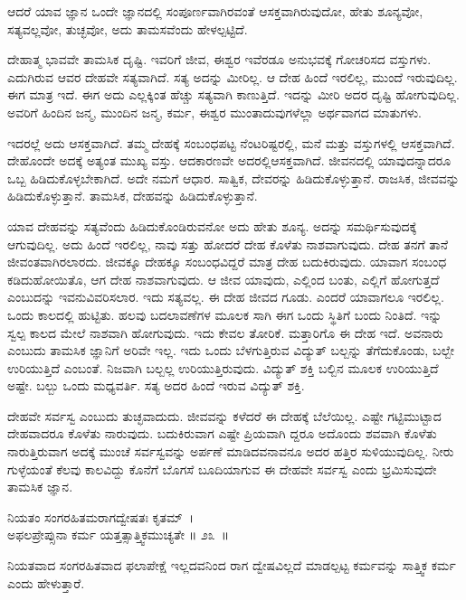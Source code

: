 \begin{artha}
ಆದರೆ ಯಾವ ಜ್ಞಾನ ಒಂದೇ ಜ್ಞಾನದಲ್ಲಿ ಸಂಪೂರ್ಣವಾಗಿರವಂತೆ ಆಸಕ್ತವಾಗಿರುವುದೋ, ಹೇತು ಶೂನ್ಯವೋ, ಸತ್ಯವಲ್ಲವೋ, ತುಚ್ಛವೋ, ಅದು ತಾಮಸವೆಂದು ಹೇಳಲ್ಪಟ್ಟಿದೆ.
\end{artha}

ದೇಹಾತ್ಮ ಭಾವವೇ ತಾಮಸಿಕ ದೃಷ್ಟಿ. ಇವರಿಗೆ ಜೀವ, ಈಶ್ವರ ಇವೆರಡೂ ಅನುಭವಕ್ಕೆ ಗೋಚರಿಸದ ವಸ್ತುಗಳು. ಎದುಗಿರುವ ಆವರ ದೇಹವೇ ಸತ್ಯವಾಗಿದೆ. ಸತ್ಯ ಅದನ್ನು ಮೀರಿಲ್ಲ. ಆ ದೇಹ ಹಿಂದೆ ಇರಲಿಲ್ಲ, ಮುಂದೆ ಇರುವುದಿಲ್ಲ. ಈಗ ಮಾತ್ರ ಇದೆ. ಈಗ ಅದು ಎಲ್ಲಕ್ಕಿಂತ ಹೆಚ್ಚು ಸತ್ಯವಾಗಿ ಕಾಣುತ್ತಿದೆ. ಇದನ್ನು ಮೀರಿ ಅದರ ದೃಷ್ಟಿ ಹೋಗುವುದಿಲ್ಲ. ಅವರಿಗೆ ಹಿಂದಿನ ಜನ್ಮ, ಮುಂದಿನ ಜನ್ಮ, ಕರ್ಮ, ಈಶ್ವರ ಮುಂತಾದುವುಗಳೆಲ್ಲಾ ಅರ್ಥವಾಗದ ಮಾತುಗಳು.

ಇದರಲ್ಲೆ ಅದು ಆಸಕ್ತವಾಗಿದೆ. ತಮ್ಮ ದೇಹಕ್ಕೆ ಸಂಬಂಧಪಟ್ಟ ನೆಂಟರಿಷ್ಟರಲ್ಲಿ, ಮನೆ ಮತ್ತು ವಸ್ತುಗಳಲ್ಲಿ ಆಸಕ್ತವಾಗಿದೆ. ದೇಹೊಂದೇ ಅದಕ್ಕೆ ಅತ್ಯಂತ ಮುಖ್ಯ ವಸ್ತು. ಆದಕಾರಣವೇ ಅದರಲ್ಲಿಆಸಕ್ತವಾಗಿದೆ. ಜೀವನದಲ್ಲಿ ಯಾವುದನ್ನಾದರೂ ಒಬ್ಬ ಹಿಡಿದುಕೊಳ್ಳಬೇಕಾಗಿದೆ. ಅದೇ ನಮಗೆ ಆಧಾರ. ಸಾತ್ವಿಕ, ದೇವರನ್ನು ಹಿಡಿದುಕೊಳ್ಳುತ್ತಾನೆ. ರಾಜಸಿಕ, ಜೀವವನ್ನು ಹಿಡಿದುಕೊಳ್ಳುತ್ತಾನೆ. ತಾಮಸಿಕ, ದೇಹವನ್ನು ಹಿಡಿದುಕೊಳ್ಳುತ್ತಾನೆ.

ಯಾವ ದೇಹವನ್ನು ಸತ್ಯವೆಂದು ಹಿಡಿದುಕೊಂಡಿರುವನೋ ಅದು ಹೇತು ಶೂನ್ಯ. ಅದನ್ನು ಸಮರ್ಥಿಸುವುದಕ್ಕೆ ಆಗುವುದಿಲ್ಲ. ಅದು ಹಿಂದೆ ಇರಲಿಲ್ಲ, ನಾವು ಸತ್ತು ಹೋದರೆ ದೇಹ ಕೊಳೆತು ನಾಶವಾಗುವುದು. ದೇಹ ತನಗೆ ತಾನೆ ಜೀವಂತವಾಗಿರಲಾರದು. ಜೀವಕ್ಕೂ ದೇಹಕ್ಕೂ ಸಂಬಂಧವಿದ್ದರೆ ಮಾತ್ರ ದೇಹ ಬದುಕಿರುವುದು. ಯಾವಾಗ ಸಂಬಂಧ ಕಡಿದುಹೋಯಿತೊ, ಆಗ ದೇಹ ನಾಶವಾಗುವುದು. ಆ ಜೀವ ಯಾವುದು, ಎಲ್ಲಿಂದ ಬಂತು, ಎಲ್ಲಿಗೆ ಹೋಗುತ್ತದೆ ಎಂಬುದನ್ನು ಇವನುವಿವರಿಸಲಾರ. ಇದು ಸತ್ಯವಲ್ಲ. ಈ ದೇಹ ಜೀವದ ಗೂಡು. ಎಂದರೆ ಯಾವಾಗಲೂ ಇರಲಿಲ್ಲ. ಒಂದು ಕಾಲದಲ್ಲಿ ಹುಟ್ಟಿತು. ಹಲವು ಬದಲಾವಣೆಗಳ ಮೂಲಕ ಸಾಗಿ ಈಗ ಒಂದು ಸ್ಥಿತಿಗೆ ಬಂದು ನಿಂತಿದೆ. ಇನ್ನು ಸ್ವಲ್ಪ ಕಾಲದ ಮೇಲೆ ನಾಶವಾಗಿ ಹೋಗುವುದು. ಇದು ಕೇವಲ ತೋರಿಕೆ. ಮತ್ತಾರಿಗೊ ಈ ದೇಹ ಇದೆ. ಅವನಾರು ಎಂಬುದು ತಾಮಸಿಕ ಜ್ಞಾನಿಗೆ ಅರಿವೇ ಇಲ್ಲ. ಇದು ಒಂದು ಬೆಳಗುತ್ತಿರುವ ವಿದ್ಯುತ್ ಬಲ್ಬನ್ನು ತೆಗೆದುಕೊಂಡು, ಬಲ್ಬೇ ಉರಿಯುತ್ತಿದೆ ಎಂಬಂತೆ. ನಿಜವಾಗಿ ಬಲ್ಬಲ್ಲ ಉರಿಯುತ್ತಿರುವುದು. ವಿದ್ಯುತ್ ಶಕ್ತಿ ಬಲ್ಬಿನ ಮೂಲಕ ಉರಿಯುತ್ತಿದೆ ಅಷ್ಟೇ. ಬಲ್ಬು ಒಂದು ಮಧ್ಯವರ್ತಿ. ಸತ್ಯ ಅದರ ಹಿಂದೆ ಇರುವ ವಿದ್ಯುತ್ ಶಕ್ತಿ.

ದೇಹವೇ ಸರ್ವಸ್ವ ಎಂಬುದು ತುಚ್ಛವಾದುದು. ಜೀವವನ್ನು ಕಳೆದರೆ ಈ ದೇಹಕ್ಕೆ ಬೆಲೆಯಿಲ್ಲ. ಎಷ್ಟೇ ಗಟ್ಟಿಮುಟ್ಟಾದ ದೇಹವಾದರೂ ಕೊಳೆತು ನಾರುವುದು. ಬದುಕಿರುವಾಗ ಎಷ್ಟೇ ಪ್ರಿಯವಾಗಿ ದ್ದರೂ ಅದೊಂದು ಶವವಾಗಿ ಕೊಳೆತು ನಾರುತ್ತಿರುವಾಗ ಅದಕ್ಕೆ ಮುಂಚೆ ಸರ್ವಸ್ವವನ್ನು ಅರ್ಪಣೆ ಮಾಡಿದವನಾವನೂ ಅದರ ಹತ್ತಿರ ಸುಳಿಯುವುದಿಲ್ಲ. ನೀರು ಗುಳ್ಳೆಯಂತೆ ಕೆಲವು ಕಾಲವಿದ್ದು ಕೊನೆಗೆ ಬೊಗಸೆ ಬೂದಿಯಾಗುವ ಈ ದೇಹವೇ ಸರ್ವಸ್ವ ಎಂದು ಭ್ರಮಿಸುವುದೇ ತಾಮಸಿಕ ಜ್ಞಾನ.

\begin{shloka}
ನಿಯತಂ ಸಂಗರಹಿತಮರಾಗದ್ವೇಷತಃ ಕೃತಮ್~।\\ಅಫಲಪ್ರೇಪ್ಸುನಾ ಕರ್ಮ ಯತ್ತತ್ಸಾತ್ತ್ವಿಕಮುಚ್ಯತೇ \hfill॥ ೨೩~॥
\end{shloka}

\begin{artha}
ನಿಯತವಾದ ಸಂಗರಹಿತವಾದ ಫಲಾಪೇಕ್ಷೆ ಇಲ್ಲದವನಿಂದ ರಾಗ ದ್ವೇಷವಿಲ್ಲದೆ ಮಾಡಲ್ಪಟ್ಟ ಕರ್ಮವನ್ನು ಸಾತ್ತ್ವಿಕ ಕರ್ಮ ಎಂದು ಹೇಳುತ್ತಾರೆ.
\end{artha}

